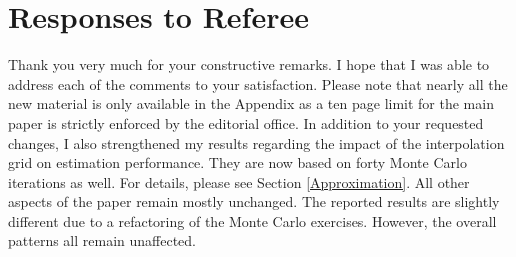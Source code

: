 \newpage\section*{Responses to Referee}\vspace{1.0cm}
Thank you very much for your constructive remarks. I hope that I was able to address each of the comments to your satisfaction. Please note that nearly all the new material is only available in the Appendix as a ten page limit for the main paper is strictly enforced by the editorial office. In addition to your requested changes, I also strengthened my results regarding the impact of the interpolation grid on estimation performance. They are now based on forty Monte Carlo iterations as well. For details, please see Section \ref{Approximation}. All other aspects of the paper remain mostly unchanged. The reported results are slightly different due to a refactoring of the Monte Carlo exercises. However, the overall patterns all remain unaffected.
